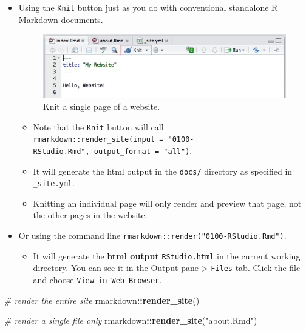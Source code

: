 \documentclass[
  a4paper,
  twoside,
  openright]{book}
\newenvironment{Shaded}{\begin{snugshade}}{\end{snugshade}}
\newcommand{\CommentTok}[1]{\textcolor[rgb]{0.56,0.35,0.01}{\textit{#1}}}
\newcommand{\FunctionTok}[1]{\textcolor[rgb]{0.13,0.29,0.53}{\textbf{#1}}}
\newcommand{\NormalTok}[1]{#1}
\newcommand{\SpecialCharTok}[1]{\textcolor[rgb]{0.81,0.36,0.00}{\textbf{#1}}}
\newcommand{\StringTok}[1]{\textcolor[rgb]{0.31,0.60,0.02}{#1}}
\providecommand{\tightlist}{%
  \setlength{\itemsep}{0pt}\setlength{\parskip}{0pt}}
\theoremstyle{definition}
\theoremstyle{definition}
\theoremstyle{definition}
\theoremstyle{definition}
\theoremstyle{remark}
\begin{document}
\begin{itemize}
\item
  Using the \texttt{Knit} button just as you do with conventional standalone R Markdown documents.

  \begin{figure}
    \includegraphics[width=16.69in]{images/site-page} \caption{Knit a single page of a website.}\label{fig:unnamed-chunk-3}
    \end{figure}

  \begin{itemize}
  \tightlist
  \item
    Note that the \texttt{Knit} button will call \texttt{rmarkdown::render\_site(input\ =\ "0100-RStudio.Rmd",\ output\_format\ =\ "all")}.
  \item
    It will generate the html output in the \texttt{docs/} directory as specified in \texttt{\_site.yml}.
  \item
    Knitting an individual page will only render and preview that page, not the other pages in the website.
  \end{itemize}
\item
  Or using the command line \texttt{rmarkdown::render("0100-RStudio.Rmd")}.

  \begin{itemize}
  \tightlist
  \item
    It will generate the \textbf{html output} \texttt{RStudio.html} in the current working directory. You can see it in the Output pane \textgreater{} \texttt{Files} tab. Click the file and choose \texttt{View\ in\ Web\ Browser}.
  \end{itemize}
\end{itemize}

\begin{Shaded}
\begin{Highlighting}[]
\CommentTok{\# render the entire site}
\NormalTok{rmarkdown}\SpecialCharTok{::}\FunctionTok{render\_site}\NormalTok{()}

\CommentTok{\# render a single file only}
\NormalTok{rmarkdown}\SpecialCharTok{::}\FunctionTok{render\_site}\NormalTok{(}\StringTok{"about.Rmd"}\NormalTok{)}
\end{Highlighting}
\end{Shaded}
\end{document}
